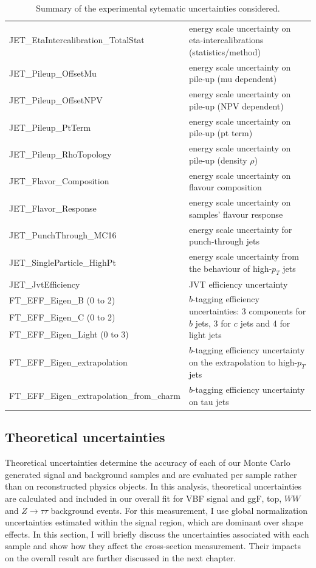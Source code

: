 \begin{table}
{\begin{tabular}{l|l}
  JET\_EtaIntercalibration\_TotalStat & energy scale uncertainty on eta-intercalibrations (statistics/method) \\
  JET\_Pileup\_OffsetMu                & energy scale uncertainty on pile-up (mu dependent)    \\
  JET\_Pileup\_OffsetNPV               & energy scale uncertainty on pile-up (NPV dependent)   \\
  JET\_Pileup\_PtTerm                  & energy scale uncertainty on pile-up (pt term)         \\
  JET\_Pileup\_RhoTopology             & energy scale uncertainty on pile-up (density $\rho$)  \\
  JET\_Flavor\_Composition             & energy scale uncertainty on flavour composition       \\
  JET\_Flavor\_Response                & energy scale uncertainty on samples' flavour response \\
  JET\_PunchThrough\_MC16              & energy scale uncertainty for punch-through jets       \\
  JET\_SingleParticle\_HighPt          & energy scale uncertainty from the behaviour of high-$p_T$ jets \\
  JET\_JvtEfficiency & JVT efficiency uncertainty      \\
  FT\_EFF\_Eigen\_B (0 to 2) & \multirow{3}{*}{\parbox{11cm}{$b$-tagging efficiency uncertainties: 3 components for $b$ jets, 3 for $c$ jets and 4 for light jets}} \\
  FT\_EFF\_Eigen\_C (0 to 2)                 & \\
  FT\_EFF\_Eigen\_Light (0 to 3)             & \\
  FT\_EFF\_Eigen\_extrapolation              & $b$-tagging efficiency uncertainty on the extrapolation to high-$p_T$ jets\\
  FT\_EFF\_Eigen\_extrapolation\_from\_charm & $b$-tagging efficiency uncertainty on tau jets \\
\hline\hline     
\end{tabular}
}
\caption{Summary of the experimental sytematic uncertainties considered.}
\label{tab:expSyst}
\end{table}

\subsection{Theoretical uncertainties}
Theoretical uncertainties determine the accuracy of each of our Monte Carlo generated signal and background samples and are evaluated per sample rather than on reconstructed physics objects. In this analysis, theoretical uncertainties are calculated and included in our overall fit for VBF signal and ggF, top, $WW$ and $Z\rightarrow\tau\tau$ background events. For this measurement, I use global normalization uncertainties estimated within the signal region, which are dominant over shape effects. In this section, I will briefly discuss the uncertainties associated with each sample and show how they affect the cross-section measurement. Their impacts on the overall result are further discussed in the next chapter.  

